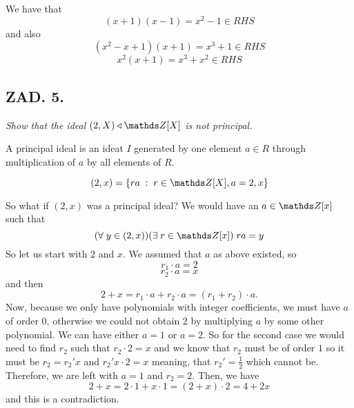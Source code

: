 \documentclass{article}[13pt]
\begin{document}
We have that 
$$(x+1)(x-1)=x^2-1\in RHS$$ 
and also 
$$(x^2-x+1)(x+1)=x^3+1\in RHS$$
$$x^2(x+1)=x^3+x^2\in RHS$$

\subsection*{ZAD. 5.}
\emph{Show that the ideal $(2, X)\dzielnat\Z[X]$ is not principal.}
\medskip

\medskip

A principal ideal is an ideat $I$ generated by one element $a\in R$ through multiplication of $a$ by all elements of $R$.
\smallskip

$$(2, x)=\{ra\;:\;r\in\Z[X],a=2,x\}$$

So what if $(2,x)$ was a principal ideal? We would have an $a\in\Z[x]$ such that 
$$(\forall\;y\in(2,x))(\exists\;r\in\Z[x])\;ra=y$$
So let us start with $2$ and $x$. We assumed that $a$ as above existed, so
$$r_1\cdot a=2$$
$$r_2\cdot a=x$$
and then
$$2+x=r_1\cdot a+r_2\cdot a=(r_1+r_2)\cdot a.$$
Now, because we only have polynomials with integer coefficients, we must have $a$ of order 0, otherwise we could not obtain $2$ by multiplying $a$ by some other polynomial. We can have either $a=1$ or $a=2$. So for the second case we would need to find $r_2$ such that $r_2\cdot2=x$ and we know that $r_2$ must be of order $1$ so it must be $r_2=r_2'x$ and $r_2'x\cdot 2=x$ meaning, that $r_2'=\frac12$ which cannot be. Therefore, we are left with $a=1$ and $r_2=2$. Then, we have
$$2+x=2\cdot 1+x\cdot 1=(2+x)\cdot 2=4+2x$$
and this is a contradiction.
\end{document}
